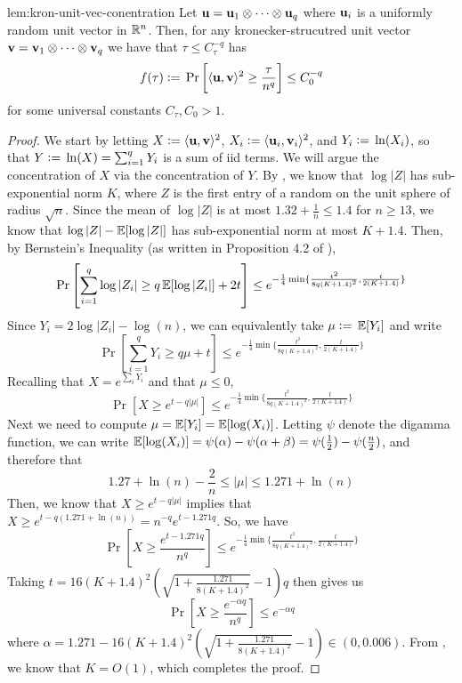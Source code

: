 \begin{replemma}{lem:kron-unit-vec-conentration}
Let \(\boldsymbol{\mathrm{u}} = \boldsymbol{\mathrm{u}}_1 \otimes \cdots \otimes \boldsymbol{\mathrm{u}}_q\) where \(\boldsymbol{\mathrm{u}}_i\) is a uniformly random unit vector in \({\mathbb R}^n\).
Then, for any kronecker-strucutred unit vector \(\boldsymbol{\mathrm{v}} = \boldsymbol{\mathrm{v}}_1 \otimes \cdots \otimes \boldsymbol{\mathrm{v}}_q\) we have that \(\tau \leq C_\tau^{-q}\) has
\[
	f(\tau)
	\;{\vcentcolon=}\;
    \Pr\left[\langle \boldsymbol{\mathrm{u}}, \boldsymbol{\mathrm{v}} \rangle^2 \geq \frac{\tau}{n^q} \right] \leq
    C_0^{-q}
\]
for some universal constants \(C_\tau, C_0 > 1\).
\end{replemma}
\begin{proof}
We start by letting \(X \;{\vcentcolon=}\; \langle \boldsymbol{\mathrm{u}},\boldsymbol{\mathrm{v}}\rangle^2\), \(X_i \;{\vcentcolon=}\; \langle \boldsymbol{\mathrm{u}}_i, \boldsymbol{\mathrm{v}}_i\rangle^2\), and \(Y_i \;{\vcentcolon=}\; \ln(X_i)\), so that \(Y \;{\vcentcolon=}\; \ln(X) = \sum_{i=1}^q Y_i\) is a sum of iid terms.
We will argue the concentration of \(X\) via the concentration of \(Y\).
By , we know that \(\log|Z|\) has sub-exponential norm \(K\), where \(Z\) is the first entry of a random on the unit sphere of radius \(\sqrt n\).
Since the mean of \(\log|Z|\) is at most \(1.32+\frac1n \leq 1.4\) for \(n \geq 13\), we know that \(\log|Z| - \operatorname*{\mathbb{E}}[\log|Z|]\) has sub-exponential norm at most \(K+1.4\).
Then, by Bernstein's Inequality (as written in Proposition 4.2 of \cite{zhang2020concentration}),
\[
    \Pr\left[\sum_{i=1}^q \log|Z_i| \geq q\operatorname*{\mathbb{E}}[\log|Z_i|] + 2t\right] \leq e^{-\frac14 \min\{\frac{t^2}{8q(K+1.4)^2},\frac{t}{2(K+1.4)}\}}
\]
Since \(Y_i = 2\log|Z_i| - \log(n)\), we can equivalently take \(\mu \;{\vcentcolon=}\; \operatorname*{\mathbb{E}}[Y_i]\) and write
\[
    \Pr[\sum_{i=1}^q Y_i \geq q\mu + t] \leq e^{-\frac14 \min\{\frac{t^2}{8q(K+1.4)^2},\frac{t}{2(K+1.4)}\}}
\]
Recalling that \(X = e^{\sum_i Y_i}\) and that \(\mu \leq 0\),
\[
    \Pr\left[X \geq e^{t-q|\mu|}\right] \leq e^{-\frac14 \min\{\frac{t^2}{8q(K+1.4)^2},\frac{t}{2(K+1.4)}\}}
\]
Next we need to compute \(\mu = \operatorname*{\mathbb{E}}[Y_i] = \operatorname*{\mathbb{E}}[\log(X_i)]\).
Letting \(\psi\) denote the digamma function, we can write \(\operatorname*{\mathbb{E}}[\log(X_i)] = \psi(\alpha) - \psi(\alpha+\beta) = \psi(\frac12)-\psi(\frac n2)\), and therefore that
\[
    1.27 + \ln(n) - \frac2n \leq |\mu| \leq 1.271 + \ln(n)
\]
Then, we know that \(X \geq e^{t-q|\mu|}\) implies that \(X \geq e^{t - q(1.271+\ln(n))} = n^{-q} e^{t-1.271q}\).
So, we have
\[
    \Pr\left[X \geq \frac{e^{t-1.271q}}{n^q}\right] \leq e^{-\frac14 \min\{\frac{t^2}{8q(K+1.4)^2},\frac{t}{2(K+1.4)}\}}
\]
Taking \(t=16(K+1.4)^2(\sqrt{1+\frac{1.271}{8(K+1.4)^2}}-1)q\) then gives us
\[
    \Pr\left[X \geq \frac{e^{-\alpha q}}{n^q}\right] \leq e^{-\alpha q}
\]
where \(\alpha = 1.271 - 16(K+1.4)^2(\sqrt{1+\frac{1.271}{8(K+1.4)^2}}-1) \in (0,0.006)\).
From , we know that \(K = O(1)\), which completes the proof.
\end{proof}


